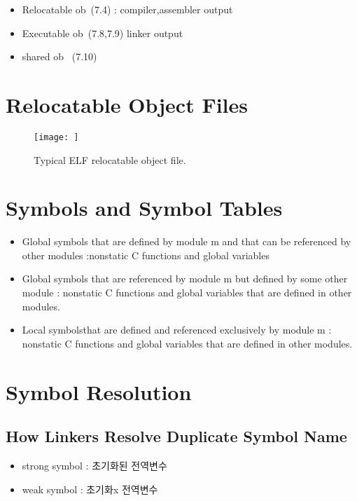 \begin{itemize}
    \item Relocatable ob~(7.4) : compiler,assembler output
    \item Executable ob~(7.8,7.9) linker output
    \item shared ob~ (7.10)
\end{itemize}



\section{Relocatable Object Files}


\begin{figure}[h!]
    \centering
    \texttt{[image: ]}
    \caption{Typical ELF relocatable object file.}
\end{figure}


\section{Symbols and Symbol Tables}


\begin{itemize}
    \item Global symbols that are defined by module m and that can be referenced by other modules :nonstatic C functions and
    global variables
    \item Global symbols that are referenced by module m but defined by some other module : nonstatic C functions and global variables that are defined in other modules.
    \item Local symbolsthat are defined and referenced exclusively by module m : nonstatic C functions and global variables that are defined in other modules.
\end{itemize}

\section{Symbol Resolution}

\subsection{How Linkers Resolve Duplicate Symbol Name}

\begin{itemize}
    \item strong symbol : 초기화된 전역변수
    \item weak symbol : 초기화x 전역변수
\end{itemize}

